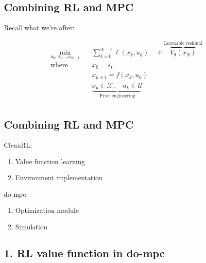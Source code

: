\documentclass[
  letterpaper,
  DIV=11,
  numbers=noendperiod,
  oneside]{scrartcl}
\providecommand{\tightlist}{%
  \setlength{\itemsep}{0pt}\setlength{\parskip}{0pt}}\usepackage{longtable,booktabs,array}
\begin{document}

\subsection{Combining RL and MPC}\label{combining-rl-and-mpc}

Recall what we're after:

\begin{align}
\min_{u_0, u_1, \ldots u_{N - 1}} \quad & \sum_{k=0}^{N-1} \ell(x_k, u_k) \quad + \overbrace{V_{\theta}(x_N)}^{\text{Learnable residual}}\\
\text{where }\quad & x_0 = s_t \\
& x_{k+1} = f(x_k, u_k) \\
& \underbrace{x_k \in \mathcal{X},\quad u_k \in \mathcal{U}}_{\text{Prior engineering}} \\
\end{align}

\subsection{Combining RL and MPC}\label{combining-rl-and-mpc-1}

CleanRL:

\begin{enumerate}
\def\labelenumi{\arabic{enumi}.}
\tightlist
\item
  Value function learning
\item
  Environment implementation
\end{enumerate}

do-mpc:

\begin{enumerate}
\def\labelenumi{\arabic{enumi}.}
\tightlist
\item
  Optimization module
\item
  Simulation
\end{enumerate}

\subsection{1. RL value function in
do-mpc}\label{rl-value-function-in-do-mpc}
\end{document}
